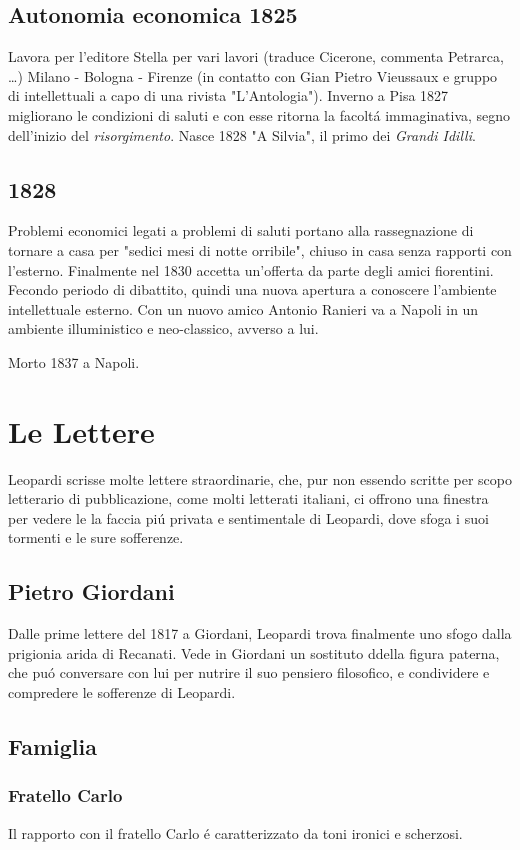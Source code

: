 \documentclass{report}
\begin{document}
\subsection*{Autonomia economica 1825}
Lavora per l'editore Stella per vari lavori (traduce Cicerone, commenta Petrarca, \dots) Milano - Bologna - Firenze (in contatto con Gian Pietro Vieussaux e gruppo di intellettuali a capo di una rivista "L'Antologia"). Inverno a Pisa 1827 migliorano le condizioni di saluti e con esse ritorna la facoltá immaginativa, segno dell'inizio del \emph{risorgimento}. Nasce 1828 "A Silvia", il primo dei \emph{Grandi Idilli}.
\subsection*{1828}
Problemi economici legati a problemi di saluti portano alla rassegnazione di tornare a casa per "sedici mesi di notte orribile", chiuso in casa senza rapporti con l'esterno. Finalmente nel 1830 accetta un'offerta da parte degli amici fiorentini. Fecondo periodo di dibattito, quindi una nuova apertura a conoscere l'ambiente intellettuale esterno. Con un nuovo amico Antonio Ranieri va a Napoli in un ambiente illuministico e neo-classico, avverso a lui.

Morto 1837 a Napoli.
\section{Le Lettere}
Leopardi scrisse molte lettere straordinarie, che, pur non essendo scritte per scopo letterario di pubblicazione, come molti letterati italiani, ci offrono una finestra per vedere le la faccia piú privata e sentimentale di Leopardi, dove sfoga i suoi tormenti e le sure sofferenze.
\subsection*{Pietro Giordani}
Dalle prime lettere del 1817 a Giordani, Leopardi trova finalmente uno sfogo dalla prigionia arida di Recanati. Vede in Giordani un sostituto ddella figura paterna, che puó conversare con lui per nutrire il suo pensiero filosofico, e condividere e compredere le sofferenze di Leopardi.
\subsection*{Famiglia}
\subsubsection{Fratello Carlo}
Il rapporto con il fratello Carlo é caratterizzato da toni ironici e scherzosi.
\end{document}

